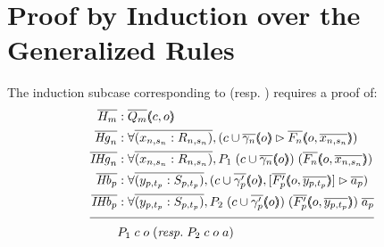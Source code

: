 \section{Proof by Induction over the Generalized Rules}
\label{sec:pfgsl}

The induction subcase corresponding to 
(resp. ) requires a proof of:
\pagebreak[0]
\begin{align*}
\ol{H_m} &: \ol{Q_m} \args{c , o} \\
\ol{\mathit{Hg}_n} &: \forall \ol{(x_{n,s_n} : R_{n,s_n})}, (\seqsl[c \cup \ol{\gamma_n} \args{o}]{\ol{F_n} \args{o , \ol{x_{n,s_n}}})} \\
\ol{\mathit{IHg}_n} &: \forall \ol{(x_{n,s_n} : R_{n,s_n})}, P_1 \; (c \cup \ol{\gamma_n} \args{o}) \; (\ol{F_n} \args{o , \ol{x_{n,s_n}}}) \\
\ol{\mathit{Hb}_p} &: \forall \ol{(y_{p,t_p} : S_{p,t_p})}, (\bchsl[c \cup \ol{\gamma'_p} \args{o}]{\ol{F'_p} \args{o , \ol{y_{p,t_p}}}}{\ol{a_p}}) \\
\ol{\mathit{IHb}_p} &: \forall \ol{(y_{p,t_p} : S_{p,t_p})}, P_2 \; (c \cup \ol{\gamma'_p} \args{o}) \; (\ol{F'_p} \args{o , \ol{y_{p,t_p}}}) \; \ol{a_p} \\[\pfshift{}]
\cline{1-2}
& P_1 \; c \; o \; (\mathit{resp.} \; P_2 \; c \; o \; a)
\end{align*}

